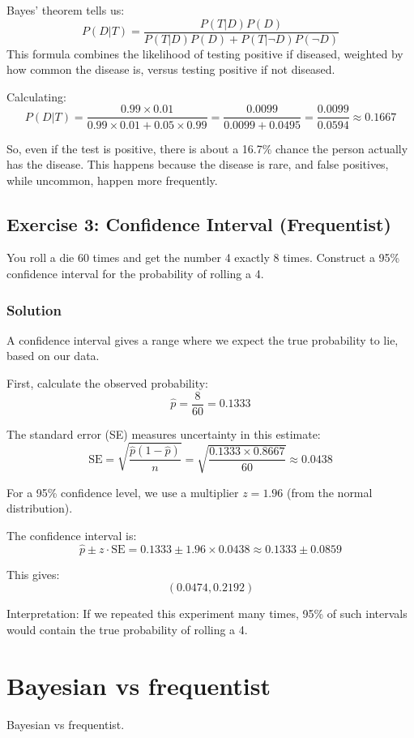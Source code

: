 \documentclass{book}
\begin{document}
Bayes’ theorem tells us:
\[
P(D | T) = \frac{P(T|D)P(D)}{P(T|D)P(D) + P(T|\neg D)P(\neg D)}
\]
This formula combines the likelihood of testing positive if diseased, weighted by how common the disease is, versus testing positive if not diseased.

Calculating:
\[
P(D | T) = \frac{0.99 \times 0.01}{0.99 \times 0.01 + 0.05 \times 0.99} = \frac{0.0099}{0.0099 + 0.0495} = \frac{0.0099}{0.0594} \approx 0.1667
\]

So, even if the test is positive, there is about a 16.7\% chance the person actually has the disease. This happens because the disease is rare, and false positives, while uncommon, happen more frequently.

\subsection*{Exercise 3: Confidence Interval (Frequentist)}
You roll a die 60 times and get the number 4 exactly 8 times. Construct a 95\% confidence interval for the probability of rolling a 4.

\subsubsection*{Solution}
A confidence interval gives a range where we expect the true probability to lie, based on our data.

First, calculate the observed probability:
\[
\hat{p} = \frac{8}{60} = 0.1333
\]

The standard error (SE) measures uncertainty in this estimate:
\[
\text{SE} = \sqrt{\frac{\hat{p}(1 - \hat{p})}{n}} = \sqrt{\frac{0.1333 \times 0.8667}{60}} \approx 0.0438
\]

For a 95\% confidence level, we use a multiplier $z=1.96$ (from the normal distribution).

The confidence interval is:
\[
\hat{p} \pm z \cdot \text{SE} = 0.1333 \pm 1.96 \times 0.0438 \approx 0.1333 \pm 0.0859
\]

This gives:
\[
(0.0474, 0.2192)
\]

Interpretation: If we repeated this experiment many times, 95\% of such intervals would contain the true probability of rolling a 4.

\newpage

\section{Bayesian vs frequentist}
Bayesian vs frequentist.
\end{document}
